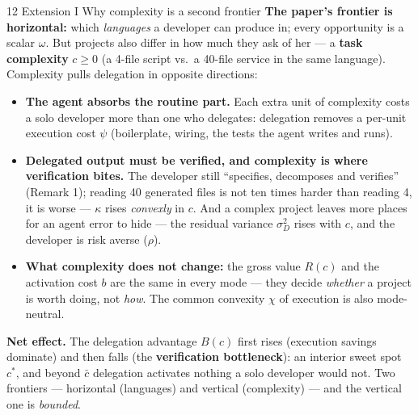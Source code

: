 \documentclass[aspectratio=169,11pt]{beamer}
\begin{document}
\begin{frame}{12 \textperiodcentered{} Extension I \textperiodcentered{} Why complexity is a second frontier}
  \footnotesize
  \textbf{The paper's frontier is horizontal:} which \emph{languages} a developer can produce in; every
  opportunity is a scalar $\omega$. But projects also differ in how much they ask of her --- a
  \textbf{task complexity} $c\ge 0$ (a 4-file script vs.\ a 40-file service in the same language).
  Complexity pulls delegation in opposite directions:
  \begin{itemize}
    \item[$+$] \textbf{The agent absorbs the routine part.} Each extra unit of complexity costs a solo
      developer more than one who delegates: delegation removes a per-unit execution cost $\psi$
      (boilerplate, wiring, the tests the agent writes and runs).
    \item[$-$] \textbf{Delegated output must be verified, and complexity is where verification bites.}
      The developer still ``specifies, decomposes and verifies'' (Remark 1); reading 40 generated files is
      not ten times harder than reading 4, it is worse --- $\kappa$ rises \emph{convexly} in $c$. And a
      complex project leaves more places for an agent error to hide --- the residual variance
      $\sigma_D^2$ rises with $c$, and the developer is risk averse ($\rho$).
    \item[$0$] \textbf{What complexity does not change:} the gross value $R(c)$ and the activation cost
      $b$ are the same in every mode --- they decide \emph{whether} a project is worth doing, not
      \emph{how}. The common convexity $\chi$ of execution is also mode-neutral.
  \end{itemize}
  \textbf{Net effect.} The delegation advantage $B(c)$ first rises (execution savings dominate) and then
  falls (the \textbf{verification bottleneck}): an interior sweet spot $c^*$, and beyond $\bar c$
  delegation activates nothing a solo developer would not. Two frontiers --- horizontal (languages) and
  vertical (complexity) --- and the vertical one is \emph{bounded}.
\end{frame}
\end{document}
